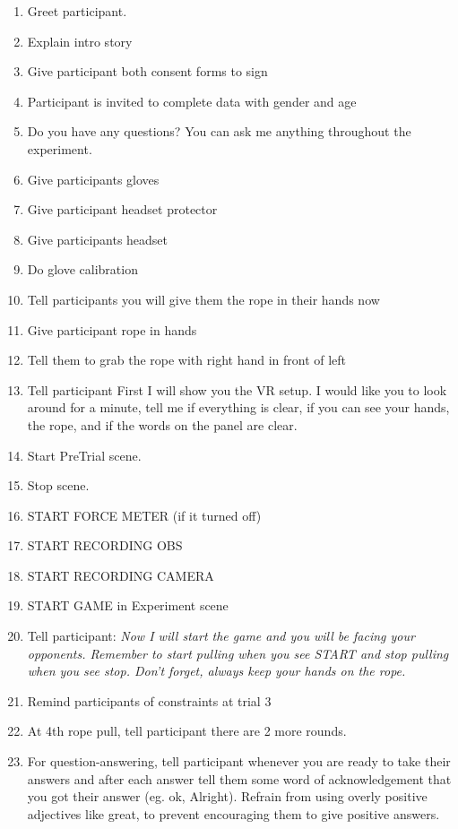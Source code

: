 \begin{enumerate}
\itemsep0em 
\item Greet participant.
\item Explain intro story
\item Give participant both consent forms to sign
\item Participant is invited to complete data with gender and age
\item Do you have any questions? You can ask me anything throughout the experiment.
\item Give participants gloves
\item Give participant headset protector
\item Give participants headset
\item Do glove calibration
\item Tell participants you will give them the rope in their hands now
\item Give participant rope in hands 
\item Tell them to grab the rope with right hand in front of left
\item Tell participant First I will show you the VR setup. I would like you to look around for a minute, tell me if everything is clear, if you can see your hands, the rope, and if the words on the panel are clear.
\item Start PreTrial scene.
\item Stop scene.
\item START FORCE METER (if it turned off)
\item START RECORDING OBS
\item START RECORDING CAMERA
\item START GAME in Experiment scene
\item  Tell participant: \textit{Now I will start the game and you will be facing your opponents. Remember to start pulling when you see START and stop pulling when you see stop. Don’t forget, always keep your hands on the rope.}
\item Remind participants of constraints at trial 3
\item At 4th rope pull, tell participant there are 2 more rounds.
\item For question-answering, tell participant whenever you are ready to take their answers and after each answer tell them some word of acknowledgement that you got their answer (eg. ok, Alright). Refrain from using overly positive adjectives like great, to prevent encouraging them to give positive answers.
\end{enumerate}
